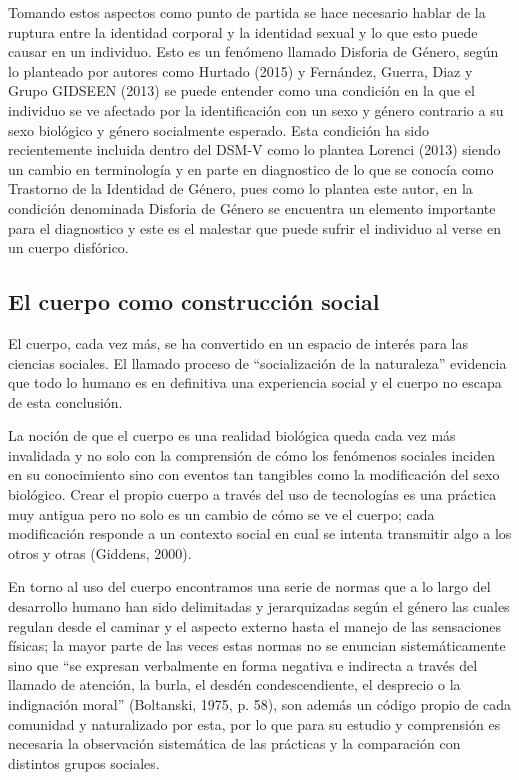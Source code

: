 Tomando estos aspectos como punto de partida se hace necesario hablar de la
ruptura entre la identidad corporal y la identidad sexual y lo que esto puede
causar en un individuo.
Esto es un fenómeno llamado Disforia de Género, según lo planteado por autores
como Hurtado (2015) y Fernández, Guerra, Diaz y Grupo GIDSEEN (2013) se puede
entender como una condición en la que el individuo se ve afectado por la
identificación con un sexo y género contrario a su sexo biológico y género
socialmente esperado.
Esta condición ha sido recientemente incluida dentro del DSM-V como lo plantea
Lorenci (2013) siendo un cambio en terminología y en parte en diagnostico de lo
que se conocía como Trastorno de la Identidad de Género, pues como lo plantea
este autor, en la condición denominada Disforia de Género se encuentra un
elemento importante para el diagnostico y este es el malestar que puede sufrir
el individuo al verse en un cuerpo disfórico.

\subsection{El cuerpo como construcción social}
El cuerpo, cada vez más, se ha convertido en un espacio de interés para las
ciencias sociales.
El llamado proceso de “socialización de la naturaleza” evidencia que todo lo
humano es en definitiva una experiencia social y el cuerpo no escapa de esta
conclusión.

La noción de que el cuerpo es una realidad biológica queda cada vez más
invalidada y no solo con la comprensión de cómo los fenómenos sociales inciden
en su conocimiento sino con eventos tan tangibles como la modificación del sexo
biológico.
Crear el propio cuerpo a través del uso de tecnologías es una práctica muy
antigua pero no solo es un cambio de cómo se ve el cuerpo;
cada modificación responde a un contexto social en cual se intenta transmitir
algo a los otros y otras (Giddens, 2000).

En torno al uso del cuerpo encontramos una serie de normas que a lo largo del
desarrollo humano han sido delimitadas y jerarquizadas según el género las
cuales regulan desde el caminar y el aspecto externo hasta el manejo de las
sensaciones físicas;
la mayor parte de las veces estas normas no se enuncian sistemáticamente sino
que “se expresan verbalmente en forma negativa e indirecta a través del
llamado de atención, la burla, el desdén condescendiente, el desprecio o la
indignación moral” (Boltanski, 1975, p. 58), son además un código propio de
cada comunidad y naturalizado por esta, por lo que para su estudio y comprensión
es necesaria la observación sistemática de las prácticas y la comparación con
distintos grupos sociales.

